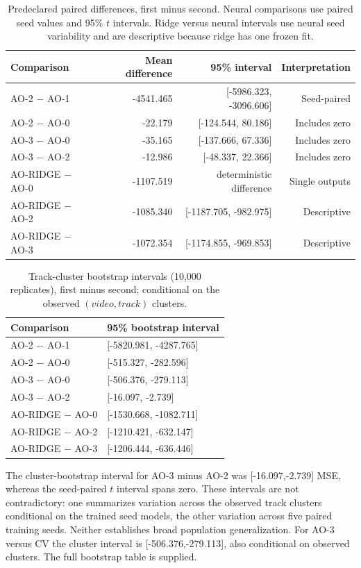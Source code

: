 \documentclass[11pt]{article}
\begin{document}
\begin{table}[H]\centering\small
\caption{Predeclared paired differences, first minus second. Neural comparisons use paired seed values and 95\% $t$ intervals. Ridge versus neural intervals use neural seed variability and are descriptive because ridge has one frozen fit.}\begin{tabular}{lrrr}\toprule Comparison & Mean difference & 95\% interval & Interpretation\\\midrule
AO-2 $-$ AO-1 & -4541.465 & [-5986.323, -3096.606] & Seed-paired\\
AO-2 $-$ AO-0 & -22.179 & [-124.544, 80.186] & Includes zero\\
AO-3 $-$ AO-0 & -35.165 & [-137.666, 67.336] & Includes zero\\
AO-3 $-$ AO-2 & -12.986 & [-48.337, 22.366] & Includes zero\\
AO-RIDGE $-$ AO-0 & -1107.519 & deterministic difference & Single outputs\\
AO-RIDGE $-$ AO-2 & -1085.340 & [-1187.705, -982.975] & Descriptive\\
AO-RIDGE $-$ AO-3 & -1072.354 & [-1174.855, -969.853] & Descriptive\\
\bottomrule\end{tabular}\label{tab:paired}\end{table}

\begin{table}[H]\centering\scriptsize
\caption{Track-cluster bootstrap intervals (10,000 replicates), first minus second; conditional on the observed $(video,track)$ clusters.}\begin{tabular}{p{5cm}p{7cm}}\toprule Comparison & 95\% bootstrap interval\\\midrule
AO-2 $-$ AO-1 & [-5820.981, -4287.765]\\
AO-2 $-$ AO-0 & [-515.327, -282.596]\\
AO-3 $-$ AO-0 & [-506.376, -279.113]\\
AO-3 $-$ AO-2 & [-16.097, -2.739]\\
AO-RIDGE $-$ AO-0 & [-1530.668, -1082.711]\\
AO-RIDGE $-$ AO-2 & [-1210.421, -632.147]\\
AO-RIDGE $-$ AO-3 & [-1206.444, -636.446]\\
\bottomrule\end{tabular}\label{tab:bootstrap}\end{table}

The cluster-bootstrap interval for AO-3 minus AO-2 was [-16.097,-2.739] MSE, whereas the seed-paired $t$ interval spans zero. These intervals are not contradictory: one summarizes variation across the observed track clusters conditional on the trained seed models, the other variation across five paired training seeds. Neither establishes broad population generalization. For AO-3 versus CV the cluster interval is [-506.376,-279.113], also conditional on observed clusters. The full bootstrap table is supplied.
\end{document}
